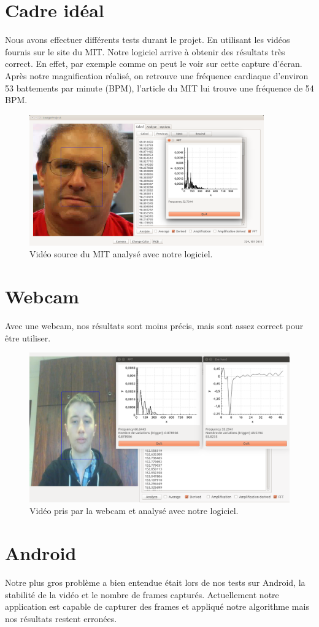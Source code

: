 \section{Cadre idéal}

Nous avons effectuer différents tests durant le projet. En utilisant les vidéos fournis sur le site du MIT. Notre logiciel arrive à obtenir des 
résultats très correct. En effet, par exemple comme on peut le voir sur cette capture d'écran. Après notre magnification réalisé, on retrouve
une fréquence cardiaque d'environ 53 battements par minute (BPM), l'article du MIT lui trouve une fréquence de 54 BPM.  

\begin{figure}[h!]
	\centering
	\includegraphics[width=0.9\textwidth]{data/cas-ideal.png}
	\caption{Vidéo source du MIT analysé avec notre logiciel.}
\end{figure}


\section{Webcam}

Avec une webcam, nos résultats sont moins précis, mais sont assez correct pour être utiliser. 

\begin{figure}[h!]
	\centering
	\includegraphics[width=1\textwidth]{data/webcam.png}
	\caption{Vidéo pris par la webcam et analysé avec notre logiciel.}
\end{figure}

\section{Android}

Notre plus gros problème a bien entendue était lors de nos tests sur Android, la stabilité de la vidéo et le nombre de frames capturés.
Actuellement notre application est capable de capturer des frames et appliqué notre algorithme mais nos résultats restent erronées.
